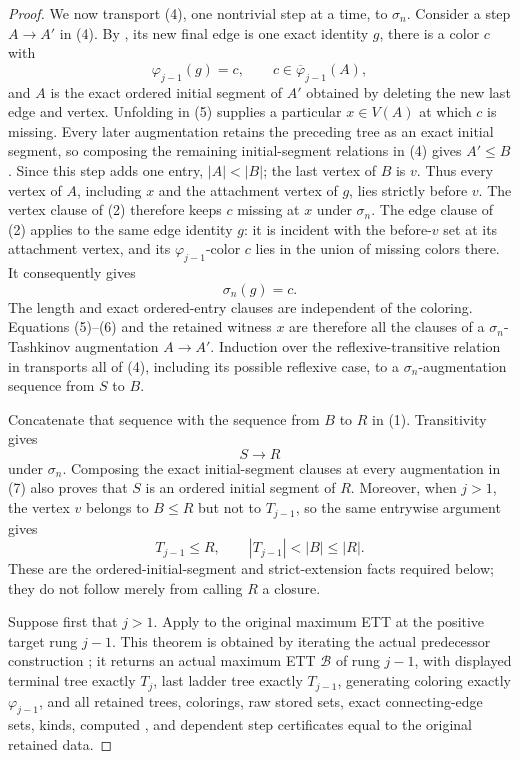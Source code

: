 \begin{proof}
We now transport (4), one nontrivial step at a time, to $\sigma_n$.
Consider a step $A\to A'$ in (4).  By
, its new final edge is one exact identity
$g$, there is a color $c$ with
\[
             \varphi_{j-1}(g)=c,\qquad
             c\in\overline\varphi_{j-1}(A),                 \tag{5}
\]
and $A$ is the exact ordered initial segment of $A'$ obtained by deleting
the new last edge and vertex.  Unfolding
 in (5) supplies a particular
$x\in V(A)$ at which $c$ is missing.  Every later augmentation retains
the preceding tree as an exact initial segment, so composing the remaining
initial-segment relations in (4) gives $A'\leq B$.  Since this step adds
one entry, $|A|<|B|$; the last vertex of $B$ is $v$.  Thus every vertex of
$A$, including $x$ and the attachment vertex of $g$, lies strictly before
$v$.  The vertex clause
of (2) therefore keeps $c$ missing at $x$ under $\sigma_n$.  The edge
clause of (2) applies to the same edge identity $g$: it is incident with
the before-$v$ set at its attachment vertex, and its
$\varphi_{j-1}$-color $c$ lies in the union of missing colors there.
It consequently gives
\[
                         \sigma_n(g)=c.                       \tag{6}
\]
The length and exact ordered-entry clauses are independent of the
coloring.  Equations (5)--(6) and the retained witness $x$ are therefore
all the clauses of a $\sigma_n$-Tashkinov augmentation $A\to A'$.
Induction over the reflexive-transitive relation in
 transports all of (4), including
its possible reflexive case, to a $\sigma_n$-augmentation sequence from
$S$ to $B$.

Concatenate that sequence with the sequence from $B$ to $R$ in (1).
Transitivity gives
\[
                         S\longrightarrow R                  \tag{7}
\]
under $\sigma_n$.  Composing the exact initial-segment clauses at every
augmentation in (7) also proves that $S$ is an ordered initial segment of
$R$.  Moreover, when $j>1$, the vertex $v$ belongs to $B\leq R$ but not
to $T_{j-1}$, so the same entrywise argument gives
\[
 T_{j-1}\leq R,\qquad |T_{j-1}|<|B|\leq |R|.                 \tag{8}
\]
These are the ordered-initial-segment and strict-extension facts required
below; they do not follow merely from calling $R$ a closure.

Suppose first that $j>1$.  Apply
 to the original maximum ETT at the
positive target rung $j-1$.  This theorem is obtained by iterating the
actual predecessor construction ; it
returns an actual maximum ETT $\mathcal B$ of rung $j-1$, with displayed
terminal tree exactly $T_j$, last ladder tree exactly $T_{j-1}$,
generating coloring exactly $\varphi_{j-1}$, and all retained trees,
colorings, raw stored sets, exact connecting-edge sets, kinds, computed
, and dependent step certificates equal to
the original retained data.


\end{proof}

